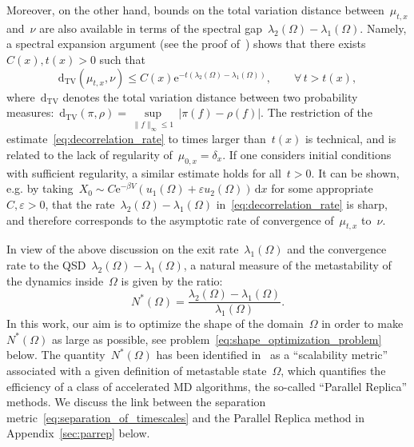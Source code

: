 \documentclass[a4]{article}
\renewcommand{\d}{\mathrm{d}}
\newcommand{\e}{\mathrm{e}}
\newcommand{\1}{\mathbbm 1}
\begin{document}
    Moreover, on the other hand, bounds on the total variation distance between~$\mu_{t,x}$ and~$\nu$ are also available in terms of the spectral gap~$\lambda_{2}(\Omega)-\lambda_{1}(\Omega)$. Namely, a spectral expansion argument (see the proof of~\cite[Theorem~1.1]{SL13}) shows that there exists~$C(x),t(x)>0$ such that
    \begin{equation}
        \label{eq:decorrelation_rate}
        \d_{\mathrm{TV}}\left(\mu_{t,x},\nu\right) \leq C(x)\e^{-t(\lambda_2(\Omega)-\lambda_1(\Omega))},\qquad \forall\,t>t(x),
    \end{equation} 
    where~$\d_{\mathrm{TV}}$ denotes the total variation distance between two probability measures:~$\d_{\mathrm{TV}}(\pi,\rho) = \underset{\|f\|_{\infty}\leq 1}{\sup}\,|\pi(f)-\rho(f)|$.
    The restriction of the estimate~\eqref{eq:decorrelation_rate} to times larger than~$t(x)$ is technical, and is related to the lack of regularity of~$\mu_{0,x}=\delta_x$.
    If one considers initial conditions with sufficient regularity, a similar estimate holds for all~$t>0$.
    It can be shown, e.g. by taking~$X_0\sim C\e^{-\beta V}\left(u_1(\Omega)+\varepsilon u_2(\Omega)\right)\,\d x$ for some appropriate~$C,\varepsilon>0$, that the rate~$\lambda_2(\Omega)-\lambda_1(\Omega)$ in~\eqref{eq:decorrelation_rate} is sharp, and therefore corresponds to the asymptotic rate of convergence of~$\mu_{t,x}$ to~$\nu$.
    
    In view of the above discussion on the exit rate~$\lambda_1(\Omega)$ and the convergence rate to the QSD~$\lambda_2(\Omega)-\lambda_1(\Omega)$, a natural measure of the metastability of the dynamics inside~$\Omega$ is given by the ratio:
    \begin{equation}
        \label{eq:separation_of_timescales}
        N^*(\Omega) = \frac{\lambda_{2}(\Omega)-\lambda_1(\Omega)}{\lambda_1(\Omega)}.
    \end{equation}
    In this work, our aim is to optimize the shape of the domain~$\Omega$ in order to make~$N^*(\Omega)$ as large as possible, see problem~\eqref{eq:shape_optimization_problem} below. The quantity~$N^*(\Omega)$ has been identified in~\cite{V98,PUV15} as a ``scalability metric'' associated with a given definition of metastable state~$\Omega$, which quantifies the efficiency of a class of accelerated MD algorithms, the so-called ``Parallel Replica'' methods.
    We discuss the link between the separation metric~\eqref{eq:separation_of_timescales} and the Parallel Replica method in Appendix~\ref{sec:parrep} below.
    
\end{document}
